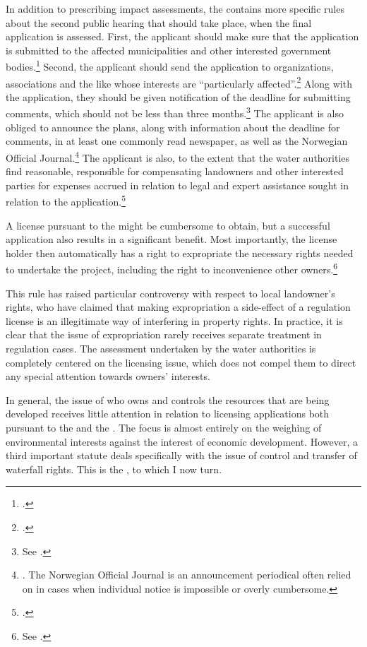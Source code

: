 In addition to prescribing impact assessments, the \cite{wra17} contains more specific rules about the second public hearing that should take place, when the final application is assessed. First, the applicant should make sure that the application is submitted to the affected municipalities and other interested government bodies.\footcite[6]{wra17} Second, the applicant should send the application to organizations, associations and the like whose interests are ``particularly affected''.\footcite[6]{wra17} Along with the application, they should be given notification of the deadline for submitting comments, which should not be less than three months.\footnote{See \cite[6]{wra17}.} The applicant is also obliged to announce the plans, along with information about the deadline for comments, in at least one commonly read newspaper, as well as the Norwegian Official Journal.\footnote{\cite[6]{wra17}. The Norwegian Official Journal is an announcement periodical often relied on in cases when individual notice is impossible or overly cumbersome.} The applicant is also, to the extent that the water authorities find reasonable, responsible for compensating landowners and other interested parties for expenses accrued in relation to legal and expert assistance sought in relation to the application.\footcite[6]{wra17}

A license pursuant to the \cite{wra17} might be cumbersome to obtain, but a successful application also results in a significant benefit. Most importantly, the license holder then automatically has a right to expropriate the necessary rights needed to undertake the project, including the right to inconvenience other owners.\footnote{See \cite[16]{wra17}.} 

This rule has raised particular controversy with respect to local landowner's rights, who have claimed that making expropriation a side-effect of a regulation license is an illegitimate way of interfering in property rights. In practice, it is clear that the issue of expropriation rarely receives separate treatment in regulation cases. The assessment undertaken by the water authorities is completely centered on the licensing issue, which does not compel them to direct any special attention towards owners' interests. 

In general, the issue of who owns and controls the resources that are being developed receives little attention in relation to licensing applications both pursuant to the \cite{wra17} and the \cite{wra00}. The focus is almost entirely on the weighing of environmental interests against the interest of economic development. However, a third important statute deals specifically with the issue of control and transfer of waterfall rights. This is the \cite{ica17}, to which I now turn. 


